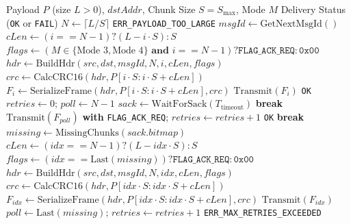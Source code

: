 \documentclass[journal]{IEEEtran}
\begin{document}
\begin{algorithm}[htpb]
\caption{LAMP Payload Transmission and SACK-ARQ (Transmitter)}
\label{alg:supp_segmentation}
\footnotesize
\begin{algorithmic}[1]
\Require Payload $P$ (size $L > 0$), $dstAddr$, Chunk Size $S = S_{\max}$, Mode $M$
\Ensure Delivery Status (\texttt{OK} or \texttt{FAIL})
\State $N \gets \lceil L / S \rceil$
 \State \Return \texttt{ERR\_PAYLOAD\_TOO\_LARGE} \EndIf
\State $msgId \gets \text{GetNextMsgId}()$
    \State $cLen \gets (i == N-1) ? (L - i \cdot S) : S$
    \State $flags \gets (M \in \{\text{Mode 3}, \text{Mode 4}\} \textbf{ and } i == N-1) ? \texttt{FLAG\_ACK\_REQ} : \texttt{0x00}$
    \State $hdr \gets \text{BuildHdr}(src, dst, msgId, N, i, cLen, flags)$
    \State $crc \gets \text{CalcCRC16}(hdr, P[i\cdot S : i\cdot S + cLen])$
    \State $F_i \gets \text{SerializeFrame}(hdr, P[i\cdot S : i\cdot S + cLen], crc)$
    \State $\text{Transmit}(F_i)$
\EndFor
{} \State \Return \texttt{OK}  \EndIf
\State $retries \gets 0$; $poll \gets N-1$
    \State $sack \gets \text{WaitForSack}(T_{\mathrm{timeout}})$
         \State \textbf{break} \EndIf
        \State $\text{Transmit}(F_{poll})$ \textbf{with} \texttt{FLAG\_ACK\_REQ}; $retries \gets retries + 1$
        \State \Return \texttt{OK} 
    \Else
         \State \textbf{break} \EndIf
        \State $missing \gets \text{MissingChunks}(sack.bitmap)$
            \State $cLen \gets (idx == N-1) ? (L - idx \cdot S) : S$
            \State $flags \gets (idx == \text{Last}(missing)) ? \texttt{FLAG\_ACK\_REQ} : \texttt{0x00}$
            \State $hdr \gets \text{BuildHdr}(src, dst, msgId, N, idx, cLen, flags)$
            \State $crc \gets \text{CalcCRC16}(hdr, P[idx\cdot S : idx\cdot S + cLen])$
            \State $F_{idx} \gets \text{SerializeFrame}(hdr, P[idx\cdot S : idx\cdot S + cLen], crc)$
            \State $\text{Transmit}(F_{idx})$
        \EndFor
        \State $poll \gets \text{Last}(missing)$; $retries \gets retries + 1$
    \EndIf
\EndWhile
\State \Return \texttt{ERR\_MAX\_RETRIES\_EXCEEDED}
\end{algorithmic}
\end{algorithm}
\end{document}
